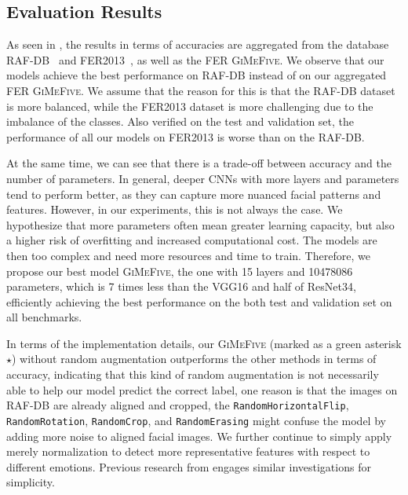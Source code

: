 \subsection{Evaluation Results}
\label{sec:evaluation:results}

As seen in , 
the results in terms of accuracies are aggregated from the database RAF-DB~\cite{kaggle_rafdb} and FER2013~\cite{kaggle_fer}, 
as well as the FER \textsc{GiMeFive}. 
We observe that our models achieve the best performance on RAF-DB instead of on our aggregated FER \textsc{GiMeFive}. 
We assume that the reason for this is that the RAF-DB dataset is more balanced, 
while the FER2013 dataset is more challenging due to the imbalance of the classes. 
Also verified on the test and validation set, 
the performance of all our models on FER2013 is worse than on the RAF-DB. 

At the same time, 
we can see that there is a trade-off between accuracy and the number of parameters. 
In general, 
deeper CNNs with more layers and parameters tend to perform better, 
as they can capture more nuanced facial patterns and features. 
However, in our experiments, 
this is not always the case. 
We hypothesize that more parameters often mean greater learning capacity, 
but also a higher risk of overfitting and increased computational cost. 
The models are then too complex and need more resources and time to train. 
Therefore, we propose our best model \textsc{GiMeFive}, 
the one with 15 layers and 10478086 parameters, 
which is 7 times less than the VGG16 and half of ResNet34, 
efficiently achieving the best performance on the both test and validation set on all benchmarks. 

In terms of the implementation details, 
our \textsc{GiMeFive} 
(marked as a green asterisk \textcolor{LMUGreen}{$\star$}) without random augmentation outperforms the other methods in terms of accuracy, 
indicating that this kind of random augmentation is not necessarily able to help our model predict the correct label, 
one reason is that the images on RAF-DB are already aligned and cropped, 
the \texttt{RandomHorizontalFlip}, \texttt{RandomRotation}, 
\texttt{RandomCrop}, and \texttt{RandomErasing} might confuse the model by adding more noise to aligned facial images. 
We further continue to simply apply merely normalization to detect more representative features with respect to different emotions.
Previous research from \citet{ZeilerF14,li_reliable_2017,VermaMRMV23} engages similar investigations for simplicity. 

